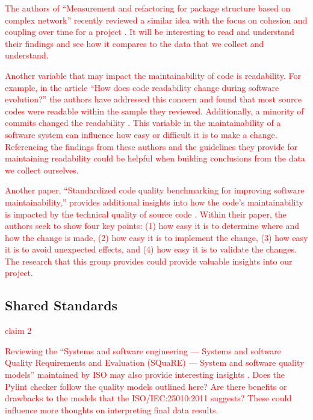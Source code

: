 \documentclass[12pt,conference]{IEEEtran}
\newcommand\todo[1]{\textcolor{red}{#1}}
\begin{document}
\todo{The authors of ``Measurement and refactoring for package structure based on complex network'' recently reviewed a similar idea with the focus on cohesion and coupling over time for a project \cite{zhou:2020}. It will be interesting to read and understand their findings and see how it compares to the data that we collect and understand.}

\todo{Another variable that may impact the maintainability of code is readability. For example, in the article ``How does code readability change during software evolution?'' the authors have addressed this concern and found that most source codes were readable within the sample they reviewed. Additionally, a minority of commits changed the readability \cite{piantadosi:2020}. This variable in the maintainability of a software system can influence how easy or difficult it is to make a change. Referencing the findings from these authors and the guidelines they provide for maintaining readability could be helpful when building conclusions from the data we collect ourselves.}

\todo{Another paper, ``Standardized code quality benchmarking for improving software maintainability,'' provides additional insights into how the code's maintainability is impacted by the technical quality of source code \cite{baggen:2012}. Within their paper, the authors seek to show four key points: (1) how easy it is to determine where and how the change is made, (2) how easy it is to implement the change, (3) how easy it is to avoid unexpected effects, and (4) how easy it is to validate the changes. The research that this group provides could provide valuable insights into our project.}

\subsection{Shared Standards}


\todo{claim 2}

\todo{Reviewing the ``Systems and software engineering — Systems and software Quality Requirements and Evaluation (SQuaRE) — System and software quality models'' maintained by ISO may also provide interesting insights \cite{iso/iec:25010:2011}. Does the Pylint checker follow the quality models outlined here? Are there benefits or drawbacks to the models that the ISO/IEC:25010:2011 suggests? These could influence more thoughts on interpreting final data results.}
\end{document}
